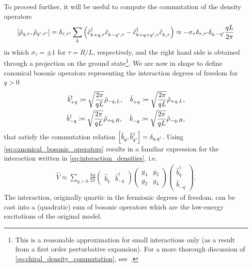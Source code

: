 To proceed further, it will be useful to compute the commutation of the density operators
\begin{align}
    \commutator{\hat\rho_{q,\tau},\hat\rho_{q',\tau'}}
    =
    \delta_{\tau,\tau'}\sum_k\brlr{\hat c^\dag_{k+q,\tau}\hat c^\pdag_{k-q',\tau}-\hat c^\dag_{k+q+q',\tau}\hat c^\pdag_{k,\tau}}
    \approx
    -\sigma_\tau\delta_{\tau,\tau'}\delta_{q,-q'}\frac{qL}{2\pi}
    \label{eq:chiral_density_commutation}
\end{align}
in which $\sigma_\tau=\pm1$ for $\tau=R/L$, respectively, and the right hand side is obtained through a projection on the ground state\footnote{This is a reasonable approximation for small interactions only (as a result from a first order perturbative expansion).
For a more thorough discussion of \cref{eq:chiral_density_commutation}, see~\cite{Giamarchi2003}.}.
We are now in shape to define canonical bosonic operators representing the interaction degrees of freedom for $q>0$
\begin{align}
    \hat b^\dag_{+q} \coloneqq \sqrt\frac{2\pi}{qL}\hat\rho_{-q,L},
    \quad
    \hat b^\pdag_{+q} \coloneqq \sqrt\frac{2\pi}{qL}\hat\rho_{+q,L},
    \\
    \hat b^\dag_{-q} \coloneqq \sqrt\frac{2\pi}{qL}\hat\rho_{+q,R},
    \quad
    \hat b^\pdag_{-q} \coloneqq \sqrt\frac{2\pi}{qL}\hat\rho_{-q,R},
    \label{eq:canonical_bosonic_operators}
\end{align}
that satisfy the commutation relation $\commutator{\hat b_q^\pdag,\hat b_{q'}^\dag} = \delta_{q,q'}$.
Using \cref{eq:canonical_bosonic_operators} results in a familiar expression for the interaction written in \cref{eq:interaction_densities}, i.e.
\begin{align}
    \hat V \approx\sum_{q>0}\frac{\hbar q}{2\pi}
    \begin{pmatrix}
        \hat b_q & \hat b^\dag_{-q}
    \end{pmatrix}
    \begin{pmatrix}
        g_4 & g_2 \\
        g_2 & g_4
    \end{pmatrix}
    \begin{pmatrix}
        \hat b^\dag_q \\ \hat b_{-q}
    \end{pmatrix}
    .
    \label{eq:quadratic_interactions}
\end{align}
The interaction, originally quartic in the fermionic degrees of freedom, can be cast into a (quadratic) sum of bosonic operators which are the low-energy excitations of the original model.
